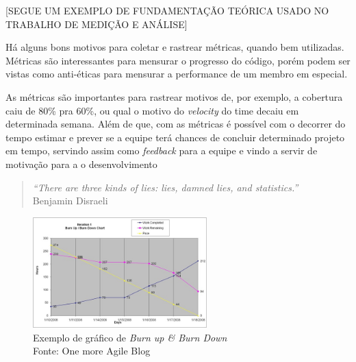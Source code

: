 


[SEGUE UM EXEMPLO DE FUNDAMENTAÇÃO TEÓRICA USADO NO TRABALHO DE MEDIÇÃO E ANÁLISE]

Há alguns bons motivos para coletar e rastrear métricas, quando bem utilizadas. Métricas são interessantes para mensurar o progresso do código, porém podem ser vistas como anti-éticas para mensurar a performance de um membro em especial\cite{crispin2009agile}.

As métricas são importantes para rastrear motivos de, por exemplo, a cobertura caiu de 80\% pra 60\%, ou qual o motivo do \textit{velocity} do time decaiu em determinada semana.
Além de que, com as métricas é possível com o decorrer do tempo estimar e prever se a equipe terá chances de concluir determinado projeto em tempo, servindo assim como \textit{feedback} para a equipe e vindo a servir de motivação para a o desenvolvimento

\begin{quote}
	\textit{“There are three kinds of lies: lies, damned lies, and statistics.”}\\Benjamin Disraeli
\end{quote}

\begin{figure}[h]
	\centering
	\includegraphics[width=0.6\textwidth]{conteudo/burnup}
	\caption{Exemplo de gráfico de \textit{Burn up \& Burn Down}\\ Fonte: One more Agile Blog\protect\footnotemark}
\end{figure}

